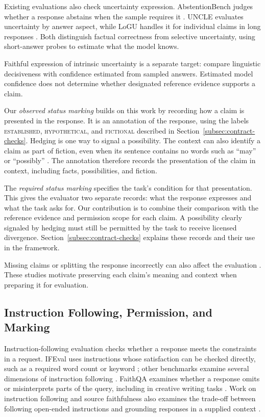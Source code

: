 \documentclass{clv2025}
\begin{document}
Existing evaluations also check uncertainty expression.
AbstentionBench judges whether a response abstains when the sample requires it
\citep{kirichenko_abstentionbench_2025}. UNCLE evaluates uncertainty by answer
aspect, while LoGU handles it for individual claims in long responses
\citep{yang_uncle_2025,yang_logu_2025}. Both distinguish factual correctness
from selective uncertainty, using short-answer probes to estimate what the
model knows.

Faithful expression of intrinsic uncertainty is a separate target:
\citet{yona_faithful_2024} compare linguistic decisiveness with confidence
estimated from sampled answers. Estimated model confidence does not
determine whether designated reference evidence supports a claim.

Our \emph{observed status marking} builds on this work by recording how
a claim is presented in the response. It is an annotation of the response,
using the labels \textsc{established}, \textsc{hypothetical}, and
\textsc{fictional} described in Section~\ref{subsec:contract-checks}. Hedging is one
way to signal a possibility. The context can also identify a claim as
part of fiction, even when its sentence contains no words such as ``may''
or ``possibly'' \citep{searle_logical_1975}. The annotation therefore
records the presentation of the claim in context, including facts,
possibilities, and fiction.

The \emph{required status marking} specifies the task's condition for
that presentation. This gives the evaluator two separate records: what
the response expresses and what the task asks for. Our contribution is
to combine their comparison with the reference evidence and permission
scope for each claim. A possibility clearly signaled by hedging must
still be permitted by the task to receive licensed divergence.
Section~\ref{subsec:contract-checks} explains these records and their use in the
framework.

Missing claims or splitting the response incorrectly can also affect the
evaluation
\citep{wanner_closer_2024,metropolitansky_claimify_2025}.
These studies motivate preserving each claim's meaning and context when
preparing it for evaluation.

\subsection{Instruction Following, Permission, and Marking}

Instruction-following evaluation checks whether a response meets the
constraints in a request. IFEval uses instructions whose satisfaction can
be checked directly, such as a required word count or keyword
\citep{zhou_ifeval_2023}; other benchmarks examine several dimensions of
instruction following \citep{ye_muldimif_2025}. FaithQA examines whether a
response omits or misinterprets parts of the query, including in creative
writing tasks \citep{hao_faithqa_2025}.
Work on instruction following and source faithfulness also examines the
trade-off between following open-ended instructions and grounding responses
in a supplied context \citep{wu_dancing_2024}.
\end{document}
